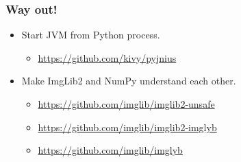 \documentclass[%
]{beamer}
\newcommand{\cmark}{\ding{51}}%
\newcommand{\urlScrSz}[1]{\scriptsize\url{#1}}
\begin{document}
\begin{frame}
    \frametitle{Way out!}
    \begin{itemize}
        \setlength{\itemindent}{-0.5cm}
          \item<1->[\only<1->{\color{green}\cmark}] Start JVM from Python process.
        \begin{itemize}
        \setlength{\itemindent}{-1.0cm}
            \setlength\itemsep{1em}
              \item<1->[] \urlScrSz{https://github.com/kivy/pyjnius}
        \end{itemize}
          \item<2->[\only<5->{\color{green}\cmark}] Make ImgLib2 and NumPy understand each other.
        \begin{itemize}
            \setlength{\itemindent}{-1.0cm}
              \item<3->[] \urlScrSz{https://github.com/imglib/imglib2-unsafe}
              \item<4->[] \urlScrSz{https://github.com/imglib/imglib2-imglyb}
              \item<5->[] \urlScrSz{https://github.com/imglib/imglyb}
        \end{itemize}
    \end{itemize}
\end{frame}
\end{document}
